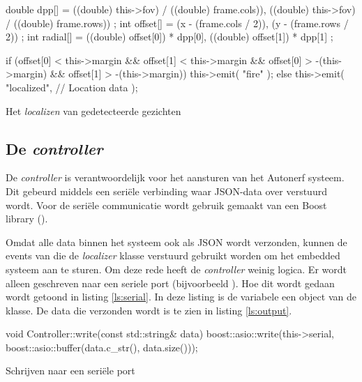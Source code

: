 \begin{listing}[H]
    \begin{cppcode}
    double dpp[] = {
        ((double) this->fov) / ((double) frame.cols)),
        ((double) this->fov) / ((double) frame.rows))
    };
    int offset[] = {
        (x - (frame.cols / 2)),
        (y - (frame.rows / 2))
    };
    int radial[] = {
        ((double) offset[0]) * dpp[0],
        ((double) offset[1]) * dpp[1]
    };

    if (offset[0] < this->margin &&
        offset[1] < this->margin &&
        offset[0] > -(this->margin) &&
        offset[1] > -(this->margin)) {
        this->emit(
            "fire"
        );
    } else {
        this->emit(
            "localized",
            // Location data
        );
    }
    \end{cppcode}
    \caption{Het \emph{localizen} van gedetecteerde gezichten}
    \label{ls:offset}
\end{listing}

\vfill
\pagebreak

\subsection{De \emph{controller}}

De \emph{controller} is verantwoordelijk voor het aansturen van het Autonerf
systeem. Dit gebeurd middels een seriële verbinding waar JSON-data over verstuurd
wordt. Voor de seriële communicatie wordt gebruik gemaakt van een Boost library
().

Omdat alle data binnen het systeem ook als JSON wordt verzonden, kunnen de
events van die de \emph{localizer} klasse verstuurd gebruikt worden om het
embedded systeem aan te sturen. Om deze rede heeft de \emph{controller} weinig
logica. Er wordt alleen geschreven naar een seriele port (bijvoorbeeld ).
Hoe dit wordt gedaan wordt getoond in listing \ref{ls:serial}. In deze listing
is de  variabele een object van de 
klasse. De data die verzonden wordt is te zien in listing \ref{ls:output}.

\begin{listing}[H]
    \begin{cppcode}
    void
    Controller::write(const std::string& data)
    {
        boost::asio::write(this->serial, boost::asio::buffer(data.c_str(), data.size()));
    }
    \end{cppcode}
    \caption{Schrijven naar een seriële port}
    \label{ls:serial}
\end{listing}

